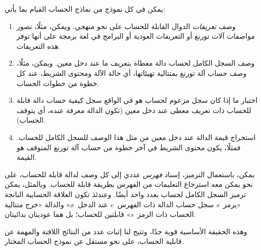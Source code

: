 \documentclass[../../../include/open-logic-section]{subfiles}
\begin{document}

يمكن في كل نموذج من نماذج الحساب القيام بما يأتي:
\begin{enumerate}
\item وصف \emph{تعريفات} الدوال القابلة للحساب على نحو منهجي. ويمكن،
  مثلًا، تصور مواصفات آلات تورنغ أو التعريفات العودية أو البرامج في
  لغة برمجة على أنها توفر هذه التعريفات.
\item وصف السجل الكامل لحساب دالة معطاة بتعريف ما عند دخل معين. ويمكن،
  مثلًا، وصف حساب آلة تورنغ بمتتالية تهيئاتها، أي حالة الآلة ومحتوى
  الشريط، عند كل خطوة من خطوات الحساب.
\item اختبار ما إذا كان سجل مزعوم لحساب هو في الواقع سجل كيفية حساب
  دالة قابلة للحساب ذات تعريف معطى عند دخل معين (تكون الدالة معرفة
  عنده، أي يتوقف الحساب).
\item استخراج قيمة الدالة عند دخل معين من مثل هذا الوصف للسجل الكامل
  للحساب. فمثلًا، يكون محتوى الشريط في آخر خطوة من حساب آلة تورنغ
  المتوقف هو القيمة.
\end{enumerate}

يمكن، باستعمال الترميز، إسناد \emph{فهرس} عددي إلى كل وصف لدالة قابلة
للحساب، على نحو يمكن معه استرجاع التعليمات من الفهرس بطريقة قابلة
للحساب. وبالمثل، يمكن ترميز السجل الكامل لحساب بعدد واحد أيضًا. وعندئذ
تكون العلاقة الحسابية الناتجة «يرمز~$s$ سجل حساب الدالة ذات الفهرس~$e$
عند الدخل~$x$» والدالة «خرج متتالية الحساب ذات الرمز~$s$» قابلتين
للحساب؛ بل هما عوديتان بدائيتان.

وهذه الحقيقة الأساسية قوية جدًا، وتتيح لنا إثبات عدد من النتائج
اللافتة والمهمة عن قابلية الحساب، على نحو مستقل عن نموذج الحساب
المختار.
\end{document}
